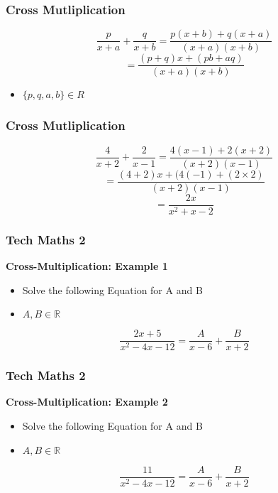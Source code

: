 \documentclass{beamer}
\begin{document}
\begin{frame}
	\frametitle{Cross Mutliplication}
	\Large
	\[  \frac{p}{x+a} + \frac{q}{x+b}   = \frac{p(x+b) + q(x+a)}{(x+a)(x+b)} \] \smallskip  \[= \frac{(p+q)x+ (pb+aq)}{(x+a)(x+b)} \]
	
	\begin{itemize}
		\item $\{p,q,a,b\} \in R$
	\end{itemize}
	
\end{frame}
\begin{frame}
	\frametitle{Cross Mutliplication}
	\Large
	\[  \frac{4}{x+2} + \frac{2}{x-1}   = \frac{4(x-1) + 2(x+2)}{(x+2)(x-1)} \] \smallskip
	\[ = \frac{(4+2)x + (4(-1)+(2\times 2)}{(x+2)(x-1)} \] \smallskip
	\[ = \frac{2x}{x^2+x-2}\]
	
	\end{frame}
	\begin{frame}
	\frametitle{Tech Maths 2}
	\Large
	\textbf{Cross-Multiplication: Example 1}
	\begin{itemize}
	\item Solve the following Equation for A and B
	\item $A,B \in \mathbb{R}$ \bigskip
	\end{itemize}
	{\LARGE
	\[ \frac{2x + 5}{x^2 - 4x - 12} = \frac{A}{x-6} + \frac{B}{x+2}\]
}
\end{frame}
\begin{frame}
	\frametitle{Tech Maths 2}
	\textbf{Cross-Multiplication: Example 2}
	\begin{itemize}
		\item Solve the following Equation for A and B
		\item $A,B \in \mathbb{R}$
	\end{itemize}
	
	\[ \frac{11}{x^2 - 4x - 12} = \frac{A}{x-6} + \frac{B}{x+2}\]
\end{frame}
\end{document}
